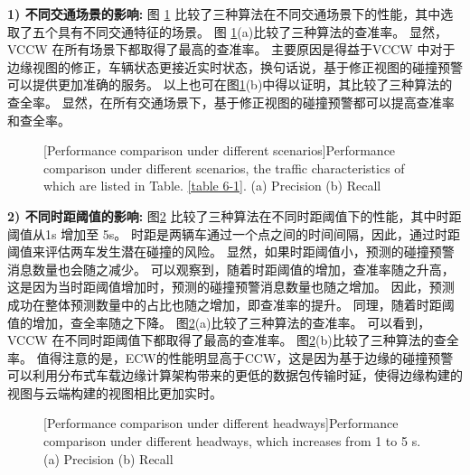 \textbf{1) 不同交通场景的影响:}
图 \ref{fig 6-5} 比较了三种算法在不同交通场景下的性能，其中选取了五个具有不同交通特征的场景。
图 \ref{fig 6-5}(a)比较了三种算法的查准率。
显然，VCCW 在所有场景下都取得了最高的查准率。
主要原因是得益于VCCW 中对于边缘视图的修正，车辆状态更接近实时状态，换句话说，基于修正视图的碰撞预警可以提供更加准确的服务。
以上也可在图\ref{fig 6-5}(b)中得以证明，其比较了三种算法的查全率。
显然，在所有交通场景下，基于修正视图的碰撞预警都可以提高查准率和查全率。


\begin{figure}[h]
     \centering
     [Performance comparison under different scenarios]{Performance comparison under different scenarios, the traffic characteristics of which are listed in Table. \ref{table 6-1}. (a) Precision (b) Recall}
     \label{fig 6-5}
\end{figure}

\textbf{2) 不同时距阈值的影响:}
图\ref{fig 6-6} 比较了三种算法在不同时距阈值下的性能，其中时距阈值从1s 增加至 5s。
时距是两辆车通过一个点之间的时间间隔，因此，通过时距阈值来评估两车发生潜在碰撞的风险。
显然，如果时距阈值小，预测的碰撞预警消息数量也会随之减少。
可以观察到，随着时距阈值的增加，查准率随之升高，这是因为当时距阈值增加时，预测的碰撞预警消息数量也随之增加。
因此，预测成功在整体预测数量中的占比也随之增加，即查准率的提升。
同理，随着时距阈值的增加，查全率随之下降。
图\ref{fig 6-6}(a)比较了三种算法的查准率。
可以看到，VCCW 在不同时距阈值下都取得了最高的查准率。
图\ref{fig 6-6}(b)比较了三种算法的查全率。
值得注意的是，ECW的性能明显高于CCW，这是因为基于边缘的碰撞预警可以利用分布式车载边缘计算架构带来的更低的数据包传输时延，使得边缘构建的视图与云端构建的视图相比更加实时。

\begin{figure}[h]
     \centering
     [Performance comparison under different headways]{Performance comparison under different headways, which increases from 1 to 5 s. (a) Precision (b) Recall}
     \label{fig 6-6}
\end{figure}

